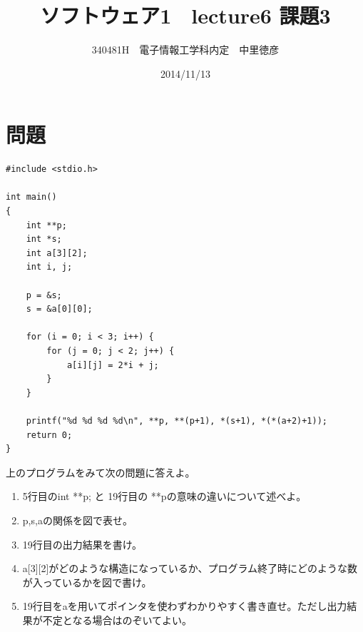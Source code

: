 \documentclass{jsarticle}
\title{ソフトウェア1　lecture6 課題3}
\author{340481H　電子情報工学科内定　中里徳彦}
\date{2014/11/13}
\begin{document}
\maketitle

\section{問題}
\begin{lstlisting}[basicstyle=\ttfamily\footnotesize, frame=single]
#include <stdio.h>

int main()
{
    int **p;
    int *s;
    int a[3][2];
    int i, j;

    p = &s;
    s = &a[0][0];

    for (i = 0; i < 3; i++) {
        for (j = 0; j < 2; j++) {
            a[i][j] = 2*i + j;
        }
    }
    
    printf("%d %d %d %d\n", **p, **(p+1), *(s+1), *(*(a+2)+1));
    return 0;
}
\end{lstlisting}

上のプログラムをみて次の問題に答えよ。

\begin{enumerate}
	\item 5行目のint **p; と 19行目の **pの意味の違いについて述べよ。
	\item p,s,aの関係を図で表せ。
	\item 19行目の出力結果を書け。
	\item a[3][2]がどのような構造になっているか、プログラム終了時にどのような数が入っているかを図で書け。
	\item 19行目をaを用いてポインタを使わずわかりやすく書き直せ。ただし出力結果が不定となる場合はのぞいてよい。
\end{enumerate}
\end{document}
